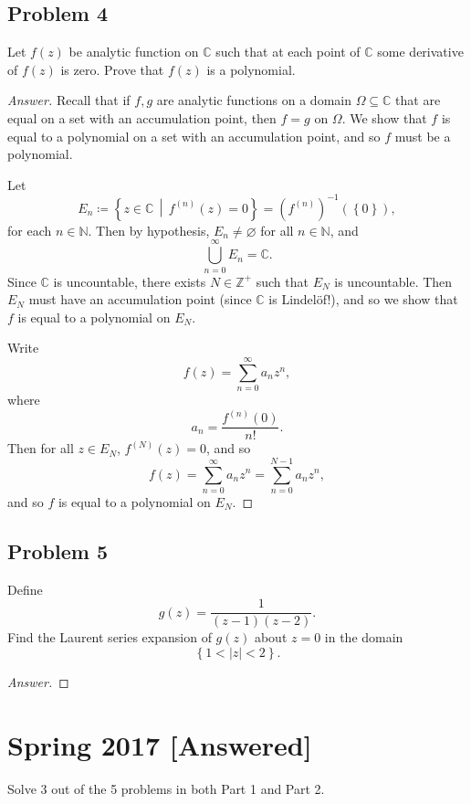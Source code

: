 \documentclass[12pt]{article}
\newcommand{\n}{\mathbb{N}}
\newcommand{\z}{\mathbb{Z}}
\newcommand{\cx}{\mathbb{C}}
\newcommand\inv[1]{#1^{-1}}
\newcommand\paren[1]{\left( #1 \right)}
\newcommand\setb[1]{\left \{ #1 \right \}}
\newcommand{\abs}[1]{\left| #1 \right|}
\theoremstyle{definition}
\begin{document}
\subsection{Problem 4 \texorpdfstring{\cite{Melody}}{}}
Let $f(z)$ be analytic function on $\cx$ such that at each point of $\cx$ some derivative of $f(z)$ is zero. Prove that $f(z)$ is a polynomial. 
\begin{proof}[Answer]
    Recall that if $f , g$ are analytic functions on a domain $\Omega \subseteq \cx$ that are equal on a set with an accumulation point, then $f = g$ on $\Omega$. We show that $f$ is equal to a polynomial on a set with an accumulation point, and so $f$ must be a polynomial. 
    
    Let
    \[
        E_n \coloneqq \setb{ z \in \cx \, \middle| \, f^{(n)}(z) = 0 } = \inv{ \paren{ f^{(n)} } } \paren{ \setb{ 0 } } , 
    \]
    for each $n \in \n$. Then by hypothesis, $E_n \neq \varnothing$ for all $n \in \n$, and 
    \[
        \bigcup\limits_{n = 0}^{\infty} E_n = \cx . 
    \]
    Since $\cx$ is uncountable, there exists $N \in \z^+$ such that $E_N$ is uncountable. Then $E_N$ must have an accumulation point (since $\cx$ is Lindel\"of!), and so we show that $f$ is equal to a polynomial on $E_N$. 
    
    Write 
    \[
        f(z) = \sum\limits_{n = 0}^{\infty} a_n z^n ,
    \]
    where 
    \[
        a_n = \frac{f^{(n)}(0)}{n!} . 
    \]
    Then for all $z \in E_N$, $f^{(N)}(z) = 0$, and so 
    \[
        f(z) = \sum\limits_{n = 0}^{\infty} a_n z^n = \sum\limits_{n = 0}^{N-1} a_n z^n ,  
    \]
    and so $f$ is equal to a polynomial on $E_N$. 
\end{proof}

\subsection{Problem 5}
Define 
\[
    g(z) = \frac{1}{(z-1)(z-2)} . 
\]
Find the Laurent series expansion of $g(z)$ about $z = 0$ in the domain 
\[
    \setb{ 1 < \abs{z} < 2 } . 
\]
\begin{proof}[Answer]
    
\end{proof}

\newpage
\section{Spring 2017 [Answered]}
Solve 3 out of the 5 problems in both Part 1 and Part 2. 
\end{document}
